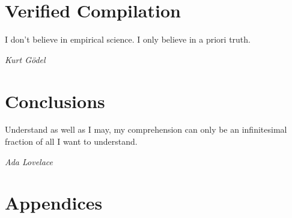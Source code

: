 \documentclass[botnum, fleqn]{unmeethesis}
\begin{document}
\chapter{Verified Compilation}\label{chap:verified}
\epigraph{I don't believe in empirical science. I only believe in a priori
truth.}{\textit{Kurt Gödel}}









\chapter{Conclusions}\label{chap:conclusion}
\epigraph{Understand as well as I may, my comprehension can only be an
infinitesimal fraction of all I want to understand.}{\textit{Ada Lovelace}}


\chapter*{Appendices}

\appendix
 \label{chap:cem_appendix}




\end{document}
